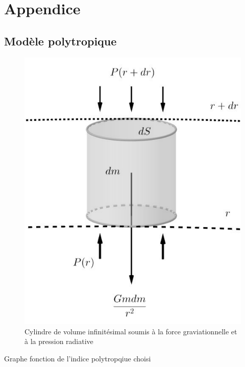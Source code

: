 


\chapter{Appendice}
\section{Modèle polytropique}

\begin{figure}[H]
	\centering
	\includegraphics[scale=0.5]{images/cylindre}
	\caption[Cylindre de volume infinitésimal soumis à la force graviationnelle et à la pression radiative - figure réalisée avec GeoGebra]{Cylindre de volume infinitésimal soumis à la force graviationnelle et à la pression radiative}
	\label{Fig. 7.1}
\end{figure}\bigskip

Graphe fonction de l'indice polytropqiue choisi


